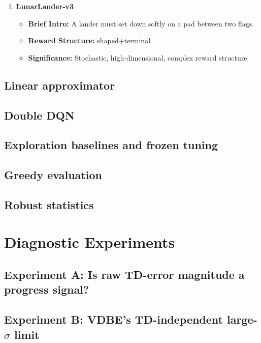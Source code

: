 \documentclass[preprint,12pt]{elsarticle}
\begin{document}
\begin{enumerate}[leftmargin=*, itemsep=0.8em]
    \item
    \begin{minipage}[t]{\linewidth}
    \textbf{LunarLander-v3}
    \begin{itemize}[leftmargin=1.5em, itemsep=0.2em, topsep=0.2em]
        \item \textbf{Brief Intro:} A lander must set down softly on a pad between two flags.
        \item \textbf{Reward Structure:} shaped+terminal
        \item \textbf{Significance:} Stochastic, high-dimensional, complex reward structure
    \end{itemize}
    \end{minipage}

\end{enumerate}

\subsection{Linear approximator}


\subsection{Double DQN}


\subsection{Exploration baselines and frozen tuning}


\subsection{Greedy evaluation}


\subsection{Robust statistics}


\section{Diagnostic Experiments}
\subsection{Experiment A: Is raw TD-error magnitude a progress signal?}


\subsection{Experiment B: VDBE's TD-independent large-$\sigma$ limit}
\end{document}
